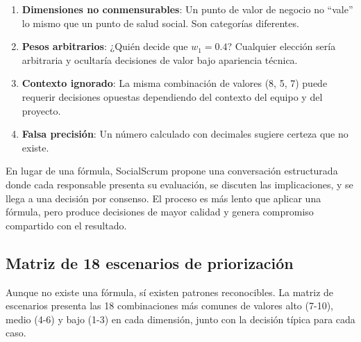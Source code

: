 \begin{enumerate}
    \item \textbf{Dimensiones no conmensurables}: Un punto de valor de negocio no ``vale'' lo mismo que un punto de salud social. Son categorías diferentes.

    \item \textbf{Pesos arbitrarios}: ¿Quién decide que $w_1 = 0.4$? Cualquier elección sería arbitraria y ocultaría decisiones de valor bajo apariencia técnica.

    \item \textbf{Contexto ignorado}: La misma combinación de valores (8, 5, 7) puede requerir decisiones opuestas dependiendo del contexto del equipo y del proyecto.

    \item \textbf{Falsa precisión}: Un número calculado con decimales sugiere certeza que no existe.
\end{enumerate}

En lugar de una fórmula, SocialScrum propone una conversación estructurada donde cada responsable presenta su evaluación, se discuten las implicaciones, y se llega a una decisión por consenso. El proceso es más lento que aplicar una fórmula, pero produce decisiones de mayor calidad y genera compromiso compartido con el resultado.

\subsection{Matriz de 18 escenarios de priorización}

Aunque no existe una fórmula, sí existen patrones reconocibles. La matriz de escenarios presenta las 18 combinaciones más comunes de valores alto (7-10), medio (4-6) y bajo (1-3) en cada dimensión, junto con la decisión típica para cada caso.

